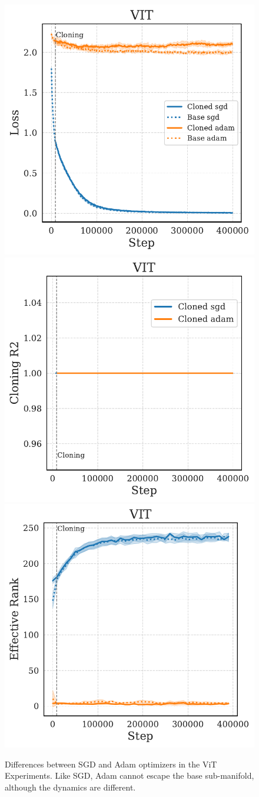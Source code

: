 \documentclass{article}
\numberwithin{figure}{section}
\begin{document}
\begin{figure}
    \centering
    \includegraphics[width=0.3\linewidth]{paper/images/vit_optimizer_cloning_losses_plot.pdf}
    \includegraphics[width=0.3\linewidth]{paper/images/vit_optimizer_cloning_r2_plot.pdf}
    \includegraphics[width=0.3\linewidth]{paper/images/vit_optimizer_cloning_rank_plot.pdf}
    \caption{Differences between SGD and Adam optimizers in the ViT Experiments. Like SGD, Adam cannot escape the base sub-manifold, although the dynamics are different.}
    \label{fig:cloning-optimizer-diff}
\end{figure}
\end{document}
